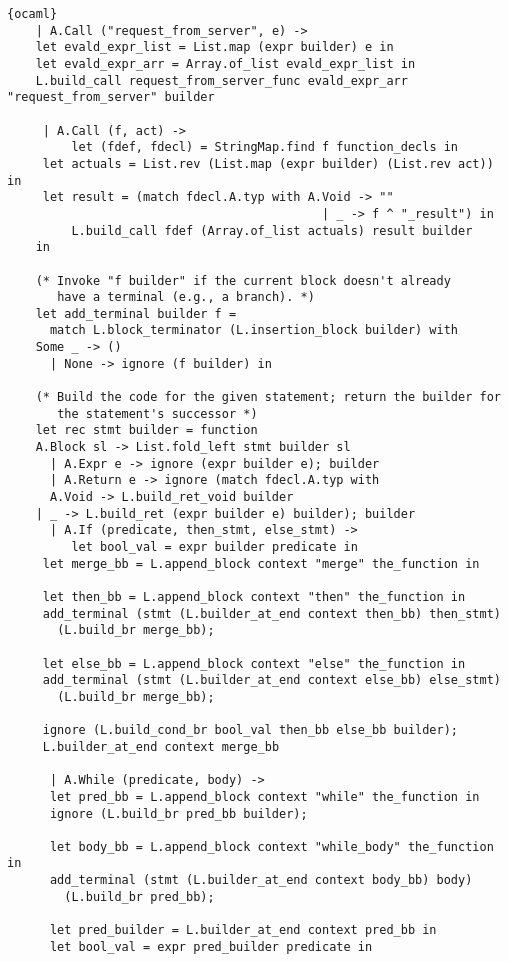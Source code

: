 \begin{lstlisting}{ocaml}
    | A.Call ("request_from_server", e) ->
	let evald_expr_list = List.map (expr builder) e in
	let evald_expr_arr = Array.of_list evald_expr_list in
	L.build_call request_from_server_func evald_expr_arr "request_from_server" builder

     | A.Call (f, act) ->
         let (fdef, fdecl) = StringMap.find f function_decls in
	 let actuals = List.rev (List.map (expr builder) (List.rev act)) in
	 let result = (match fdecl.A.typ with A.Void -> ""
                                            | _ -> f ^ "_result") in
         L.build_call fdef (Array.of_list actuals) result builder
    in

    (* Invoke "f builder" if the current block doesn't already
       have a terminal (e.g., a branch). *)
    let add_terminal builder f =
      match L.block_terminator (L.insertion_block builder) with
	Some _ -> ()
      | None -> ignore (f builder) in
	
    (* Build the code for the given statement; return the builder for
       the statement's successor *)
    let rec stmt builder = function
	A.Block sl -> List.fold_left stmt builder sl
      | A.Expr e -> ignore (expr builder e); builder
      | A.Return e -> ignore (match fdecl.A.typ with
	  A.Void -> L.build_ret_void builder
	| _ -> L.build_ret (expr builder e) builder); builder
      | A.If (predicate, then_stmt, else_stmt) ->
         let bool_val = expr builder predicate in
	 let merge_bb = L.append_block context "merge" the_function in

	 let then_bb = L.append_block context "then" the_function in
	 add_terminal (stmt (L.builder_at_end context then_bb) then_stmt)
	   (L.build_br merge_bb);

	 let else_bb = L.append_block context "else" the_function in
	 add_terminal (stmt (L.builder_at_end context else_bb) else_stmt)
	   (L.build_br merge_bb);

	 ignore (L.build_cond_br bool_val then_bb else_bb builder);
	 L.builder_at_end context merge_bb

      | A.While (predicate, body) ->
	  let pred_bb = L.append_block context "while" the_function in
	  ignore (L.build_br pred_bb builder);

	  let body_bb = L.append_block context "while_body" the_function in
	  add_terminal (stmt (L.builder_at_end context body_bb) body)
	    (L.build_br pred_bb);

	  let pred_builder = L.builder_at_end context pred_bb in
	  let bool_val = expr pred_builder predicate in


\end{lstlisting}
